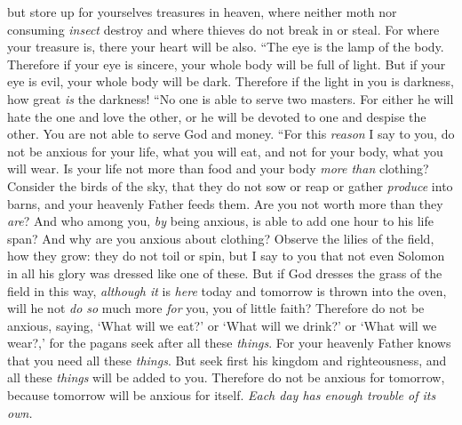 \begin{biblechapter}
\verse but store up for yourselves treasures in heaven, where neither moth nor consuming \textit{insect} destroy and where thieves do not break in or steal.
\verse For where your treasure is, there your heart will be also.
\verse “The eye is the lamp of the body. Therefore if your eye is sincere, your whole body will be full of light.
\verse But if your eye is evil, your whole body will be dark. Therefore if the light in you is darkness, how great \textit{is} the darkness!
\verse “No one is able to serve two masters. For either he will hate the one and love the other, or he will be devoted to one and despise the other. You are not able to serve God and money.
 “For this \textit{reason} I say to you, do not be anxious for your life, what you will eat, and not for your body, what you will wear. Is your life not more than food and your body \textit{more than} clothing?
\verse Consider the birds of the sky, that they do not sow or reap or gather \textit{produce} into barns, and your heavenly Father feeds them. Are you not worth more than they \textit{are}?
\verse And who among you, \textit{by} being anxious, is able to add one hour to his life span?
\verse And why are you anxious about clothing? Observe the lilies of the field, how they grow: they do not toil or spin,
\verse but I say to you that not even Solomon in all his glory was dressed like one of these.
\verse But if God dresses the grass of the field in this way, \textit{although it} is \textit{here} today and tomorrow is thrown into the oven, will he not \textit{do so} much more \textit{for} you, you of little faith?
\verse Therefore do not be anxious, saying, ‘What will we eat?’ or ‘What will we drink?’ or ‘What will we wear?,’
\verse for the pagans seek after all these \textit{things}. For your heavenly Father knows that you need all these \textit{things}.
\verse But seek first his kingdom and righteousness, and all these \textit{things} will be added to you.
\verse Therefore do not be anxious for tomorrow, because tomorrow will be anxious for itself. \textit{Each day has enough trouble of its own.}
\end{biblechapter}

